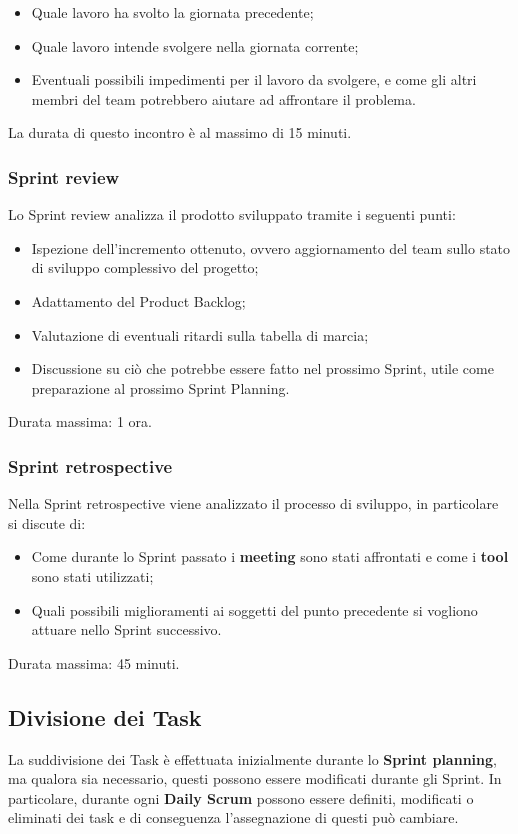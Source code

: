 \begin{itemize}
    \item Quale lavoro ha svolto la giornata precedente;
    \item Quale lavoro intende svolgere nella giornata corrente;
    \item Eventuali possibili impedimenti per il lavoro da svolgere, e come gli altri membri del team potrebbero aiutare ad affrontare il problema.
\end{itemize}
La durata di questo incontro è al massimo di 15 minuti.

\subsubsection{Sprint review}
Lo Sprint review analizza il prodotto sviluppato tramite i seguenti punti:

\begin{itemize}
    \item Ispezione dell'incremento ottenuto, ovvero aggiornamento del team sullo stato di sviluppo complessivo del progetto;
    \item Adattamento del Product Backlog;
    \item Valutazione di eventuali ritardi sulla tabella di marcia;
    \item Discussione su ciò che potrebbe essere fatto nel prossimo Sprint, utile come pre\-pa\-ra\-zione al prossimo Sprint Planning.
\end{itemize}
Durata massima: 1 ora.

\subsubsection{Sprint retrospective}
Nella Sprint retrospective viene analizzato il processo di sviluppo, in particolare si discute di:

\begin{itemize}
    \item Come durante lo Sprint passato i \textbf{meeting} sono stati affrontati e come i \textbf{tool} sono stati utilizzati;
    \item Quali possibili miglioramenti ai soggetti del punto precedente si vogliono attuare nello Sprint successivo.
\end{itemize}
Durata massima: 45 minuti.

\subsection{Divisione dei Task}
La suddivisione dei Task è effettuata inizialmente durante lo \textbf{Sprint planning}, ma qualora sia necessario, questi possono essere modificati durante gli Sprint. In particolare, durante ogni \textbf{Daily Scrum} possono essere definiti, modificati o eliminati dei task e di conseguenza l'assegnazione di questi può cambiare.

